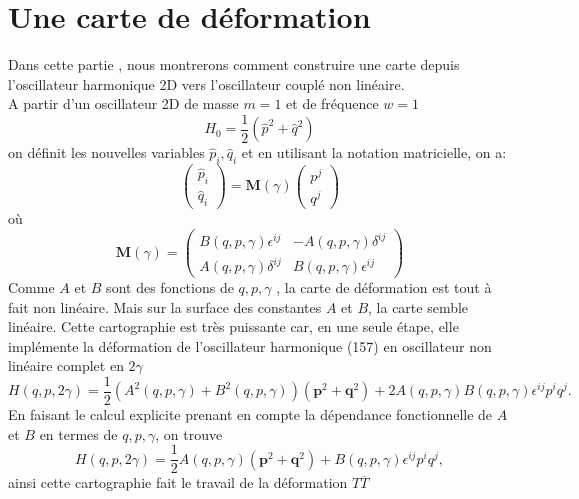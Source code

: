 \documentclass[12pt,a4paper, openany]{report}
\begin{document}
	\section{Une carte de déformation}
	Dans cette partie , nous montrerons comment construire une carte depuis l'oscillateur harmonique 2D vers l'oscillateur couplé non linéaire.\\ A partir d'un oscillateur 2D de masse $m=1$ et de fréquence $w=1$
	\begin{equation}
		H_0=\frac{1}{2}\left(\hat{p}^2+\hat{q}^2\right)
	\end{equation}
	on définit les nouvelles variables $\hat{p}_i ,\hat{q}_i $ et en utilisant la notation matricielle, on a:
	\begin{equation}
		\begin{pmatrix}
			\hat{p}_i\\
			\hat{q}_i	
		\end{pmatrix}
		=
		\textbf{M}(\gamma)
		\begin{pmatrix}
			p^j\\
			q^j	
		\end{pmatrix}
	\end{equation}
	où
	\begin{equation}
		\textbf{M}(\gamma)=
		\begin{pmatrix}
			B(q,p,\gamma)\epsilon^{ij} & -A(q,p,\gamma)\delta^{ij}\\
			A(q,p,\gamma)\delta^{ij} & B(q,p,\gamma)\epsilon^{ij}
		\end{pmatrix}
	\end{equation} Comme $A$ et $B$ sont des fonctions de $ q,p,\gamma$ , la carte de déformation est tout à fait non linéaire. Mais sur la surface des constantes $A$ et $B$, la carte semble linéaire. Cette cartographie est très puissante car, en une seule étape, elle implémente la déformation de l'oscillateur harmonique (157) en oscillateur non linéaire complet en $2\gamma$
	\begin{equation}
		H(q,p,2\gamma)=\frac{1}{2}\left(A^2(q,p,\gamma)+B^2(q,p,\gamma)\right)\left(\textbf{p}^2+\textbf{q}^2\right)+2A(q,p,\gamma)B(q,p,\gamma)\epsilon^{ij}p^iq^j.
	\end{equation} En faisant le calcul explicite prenant en compte la dépendance fonctionnelle de $A$ et $B$ en termes de $q, p,\gamma$, on trouve
	\begin{equation}
		H(q,p,2\gamma)=\frac{1}{2}A(q,p,\gamma)\left(\textbf{p}^2+\textbf{q}^2\right)+B(q,p,\gamma)\epsilon^{ij}p^iq^j,	
	\end{equation} ainsi cette cartographie fait le travail de la déformation $T\overline{T}$
\end{document}

